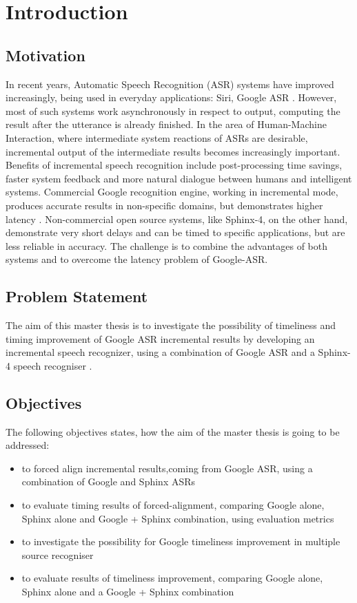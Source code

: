 \chapter{Introduction}
\label{chap:introduction}
\section {Motivation}
In recent years, Automatic Speech Recognition (ASR) systems have improved
increasingly, being used in everyday applications: Siri, Google ASR 
\parencite {mcgrawgrauenstein2012}. However, most of such systems work
asynchronously in respect to output, computing the result after the utterance is already finished.
In the area of Human-Machine Interaction, 
where intermediate system reactions of ASRs are 
desirable,  incremental output of the intermediate results becomes increasingly
important. Benefits of  incremental speech recognition include post-processing
time savings, faster system feedback and more natural dialogue between humans
and intelligent systems. Commercial Google recognition
engine, working in incremental mode, produces accurate
results in non-specific domains, but demonstrates higher latency
\parencite{mcgrawgrauenstein2012}.  Non-commercial open source systems, like Sphinx-4, on the other hand, demonstrate very short delays and can be timed to specific
applications, but are less reliable in accuracy.
The challenge is to combine the advantages of both systems and  to overcome the latency problem of Google-ASR.
\section {Problem Statement}
The aim of this master thesis is to investigate the possibility of
timeliness and timing improvement of Google ASR
incremental results by developing an incremental speech recognizer, using a
combination of Google ASR \parencite
{mcgrawgrauenstein2012} and a Sphinx-4 speech recogniser
\parencite {baumannetal2009:naacl}. 
\section {Objectives}

The following objectives states, how the aim of the master thesis is going to be
addressed:
 \begin  {itemize}
   \item to forced align incremental results,coming from Google ASR, using a
   combination of Google and Sphinx ASRs
   \item to evaluate timing results of forced-alignment, comparing Google
   alone, Sphinx alone and Google + Sphinx combination, using evaluation metrics
   \item to investigate the possibility for Google timeliness improvement in multiple source recogniser
   \item to evaluate results of timeliness improvement, comparing Google alone,
   Sphinx alone and a Google + Sphinx combination
 \end {itemize}


